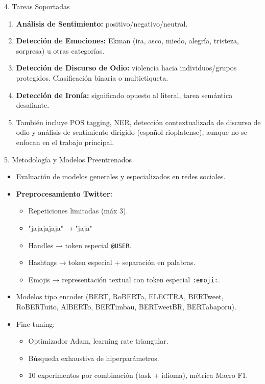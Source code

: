 \documentclass{beamer}
\begin{document}
\begin{frame}{4. Tareas Soportadas}
  \begin{enumerate}
    \item \textbf{Análisis de Sentimiento:} positivo/negativo/neutral.
    \item \textbf{Detección de Emociones:} Ekman (ira, asco, miedo, alegría, tristeza, sorpresa) u otras categorías.
    \item \textbf{Detección de Discurso de Odio:} violencia hacia individuos/grupos protegidos. Clasificación binaria o multietiqueta.
    \item \textbf{Detección de Ironía:} significado opuesto al literal, tarea semántica desafiante.
    \item También incluye POS tagging, NER, detección contextualizada de discurso de odio y análisis de sentimiento dirigido (español rioplatense), aunque no se enfocan en el trabajo principal.
  \end{enumerate}
\end{frame}

\begin{frame}{5. Metodología y Modelos Preentrenados}
  \begin{itemize}
    \item Evaluación de modelos generales y especializados en redes sociales.
    \item \textbf{Preprocesamiento Twitter:}
      \begin{itemize}
        \item Repeticiones limitadas (máx 3).
        \item "jajajajaja" → "jaja"
        \item Handles → token especial \texttt{@USER}.
        \item Hashtags → token especial + separación en palabras.
        \item Emojis → representación textual con token especial \texttt{:emoji:}.
      \end{itemize}
    \item Modelos tipo encoder (BERT, RoBERTa, ELECTRA, BERTweet, RoBERTuito, AlBERTo, BERTimbau, BERTweetBR, BERTabaporu).
    \item Fine‑tuning:
      \begin{itemize}
        \item Optimizador Adam, learning rate triangular.
        \item Búsqueda exhaustiva de hiperparámetros.
        \item 10 experimentos por combinación (task + idioma), métrica Macro F1.
      \end{itemize}
  \end{itemize}
\end{frame}
\end{document}
